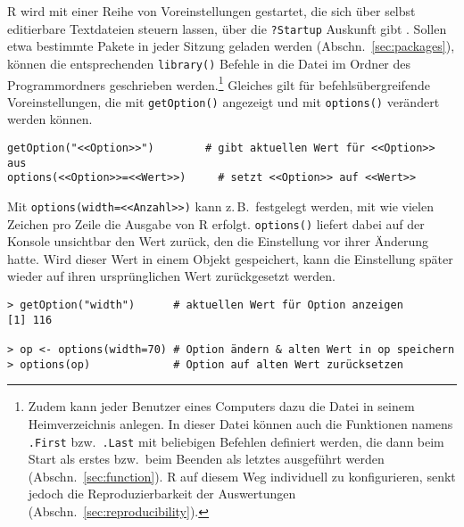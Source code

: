 R wird mit einer Reihe von Voreinstellungen gestartet, die sich über selbst editierbare Textdateien steuern lassen, über die \lstinline!?Startup! Auskunft gibt \cite{RDevelopmentCoreTeam2008a}. Sollen etwa bestimmte Pakete in jeder Sitzung geladen werden (Abschn.\ \ref{sec:packages}), können die entsprechenden \lstinline!library()! Befehle in die Datei  im  Ordner des Programmordners geschrieben werden.\footnote{Zudem kann jeder Benutzer eines Computers dazu die Datei  in seinem Heimverzeichnis anlegen. In dieser Datei können auch die Funktionen namens \lstinline!.First! bzw.\ \lstinline!.Last! mit beliebigen Befehlen definiert werden, die dann beim Start als erstes bzw.\ beim Beenden als letztes ausgeführt werden (Abschn.\ \ref{sec:function}). R auf diesem Weg individuell zu konfigurieren, senkt jedoch die Reproduzierbarkeit der Auswertungen (Abschn.\ \ref{sec:reproducibility}).} Gleiches gilt für befehlsübergreifende Voreinstellungen, die mit \lstinline!getOption()! angezeigt und mit  \lstinline!options()! verändert werden können.
\begin{lstlisting}
getOption("<<Option>>")        # gibt aktuellen Wert für <<Option>> aus
options(<<Option>>=<<Wert>>)     # setzt <<Option>> auf <<Wert>>
\end{lstlisting}

Mit \lstinline!options(width=<<Anzahl>>)! kann z.\,B.\ festgelegt werden, mit wie vielen Zeichen pro Zeile die Ausgabe von R erfolgt. \lstinline!options()! liefert dabei auf der Konsole unsichtbar den Wert zurück, den die Einstellung vor ihrer Änderung hatte. Wird dieser Wert in einem Objekt gespeichert, kann die Einstellung später wieder auf ihren ursprünglichen Wert zurückgesetzt werden.
\begin{lstlisting}
> getOption("width")      # aktuellen Wert für Option anzeigen
[1] 116

> op <- options(width=70) # Option ändern & alten Wert in op speichern
> options(op)             # Option auf alten Wert zurücksetzen
\end{lstlisting}

